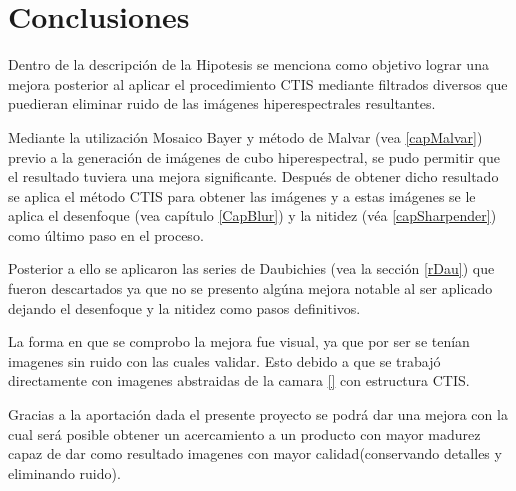 \chapter{Conclusiones} %
\label{Capitulo5} %

Dentro de la descripción de la Hipotesis se menciona como objetivo lograr una mejora posterior al aplicar el procedimiento CTIS mediante filtrados diversos que puedieran eliminar ruido de las imágenes hiperespectrales resultantes. 

Mediante la utilización Mosaico Bayer y método de Malvar (vea \ref{capMalvar}) previo a la generación de imágenes de cubo hiperespectral, se pudo permitir que el resultado tuviera una mejora significante.
Después de obtener dicho resultado se aplica el método CTIS para obtener las imágenes y a estas imágenes se le aplica el desenfoque (vea capítulo \ref{CapBlur}) y la nitidez (véa \ref{capSharpender}) como último paso en el proceso.

Posterior a ello se aplicaron las series de Daubichies (vea la sección \ref{rDau}) que fueron descartados ya que no se presento algúna mejora notable al ser aplicado dejando el desenfoque y la nitidez como pasos definitivos.

La forma en que se comprobo la mejora fue visual, ya que por ser se tenían imagenes sin ruido con las cuales validar. Esto debido a que se trabajó directamente con imagenes abstraidas de la camara \ref{} con estructura CTIS.

Gracias a la aportación dada el presente proyecto se podrá dar una mejora con la cual será posible obtener un acercamiento a un producto con mayor madurez capaz de dar como resultado imagenes con mayor calidad(conservando detalles y eliminando ruido).


